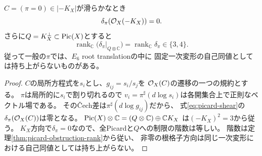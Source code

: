 \begin{proposition}[反標準線束の障害は零]\label{prop:canonical-kernel}
$C=(\pi=0)\in|-K_X|$が滑らかなとき
\[
 \delta_\pi(\mathcal O_X(-K_X))=0.
\]
さらに$Q=K_X^\perp\subset\operatorname{Pic}(X)$とすると
\[
 \operatorname{rank}_{\mathbb C}
 \bigl(\delta_\pi|_{Q\otimes\mathbb C}\bigr)
 =\operatorname{rank}_{\mathbb C}\delta_\pi
 \in\{3,4\}.
\]
従って一般の$\pi$では、$E_6$ root translationの中に
固定一次変形の自己同値としては持ち上がらないものがある。
\end{proposition}
\begin{proof}
$C$の局所方程式を$s_i$とし、$g_{ij}=s_i/s_j$を
$\mathcal O_X(C)$の遷移の一つの規約とする。
$\pi$は局所的に$s_i$で割り切れるので
$v_i=\pi^\sharp(d\log s_i)$は各開集合上で正則なベクトル場である。
そのČech差は$\pi^\sharp(d\log g_{ij})$だから、
式\eqref{eq:picard-shear}の$\delta_\pi(\mathcal O_X(C))$は零となる。
$\operatorname{Pic}(X)\otimes\mathbb C=(Q\otimes\mathbb C)\oplus\mathbb C K_X$
は$(-K_X)^2=3$から従う。
$K_X$方向で$\delta_\pi=0$なので、全Picardと$Q$への制限の階数は等しい。
階数は定理\ref{thm:picard-obstruction-rank}から従い、
非零の根格子方向は同じ一次変形における自己同値としては持ち上がらない。
\end{proof}


